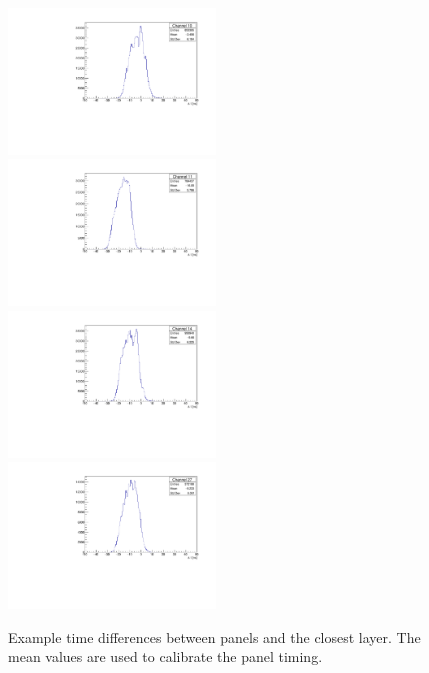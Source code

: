 \documentclass[12pt]{article}
\begin{document}
\begin{figure}
\centering
    \includegraphics[width=0.49\textwidth]{figures/timingPlots/panels/Channel_10.pdf}~
    \includegraphics[width=0.49\textwidth]{figures/timingPlots/panels/Channel_11.pdf}\\
    \includegraphics[width=0.49\textwidth]{figures/timingPlots/panels/Channel_14.pdf}~
    \includegraphics[width=0.49\textwidth]{figures/timingPlots/panels/Channel_27.pdf}
    \caption{\label{fig:timeDiffPanelLayer} Example time differences between panels and the closest layer. 
    The mean values are used to calibrate the panel timing.}
\end{figure}
\end{document}
